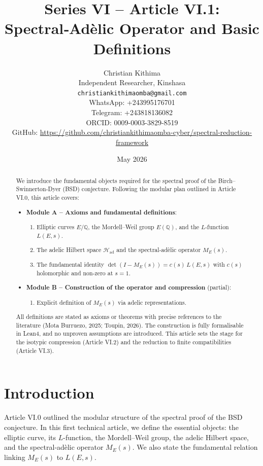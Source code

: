 \documentclass[11pt,a4paper]{article}
\title{Series VI – Article VI.1: Spectral‑Adèlic Operator and Basic Definitions}
\author{Christian Kithima \\
Independent Researcher, Kinshasa \\
\texttt{christiankithimaomba@gmail.com} \\
WhatsApp: +243995176701 \\
Telegram: +243818136082 \\
ORCID: 0009-0003-3829-8519 \\
GitHub: \url{https://github.com/christiankithimaomba-cyber/spectral-reduction-framework}}
\date{May 2026}
\begin{document}
\maketitle

\begin{abstract}
We introduce the fundamental objects required for the spectral proof of the Birch–Swinnerton-Dyer (BSD) conjecture. Following the modular plan outlined in Article VI.0, this article covers:
\begin{itemize}
\item \textbf{Module A – Axioms and fundamental definitions}:
  \begin{enumerate}
  \item Elliptic curves \(E/\mathbb{Q}\), the Mordell–Weil group \(E(\mathbb{Q})\), and the \(L\)-function \(L(E,s)\).
  \item The adelic Hilbert space \(\mathcal{H}_{\text{ad}}\) and the spectral‑adèlic operator \(M_E(s)\).
  \item The fundamental identity \(\det(I - M_E(s)) = c(s)\, L(E,s)\) with \(c(s)\) holomorphic and non‑zero at \(s=1\).
  \end{enumerate}
\item \textbf{Module B – Construction of the operator and compression} (partial):
  \begin{enumerate}
  \item Explicit definition of \(M_E(s)\) via adelic representations.
  \end{enumerate}
\end{itemize}
All definitions are stated as axioms or theorems with precise references to the literature (Mota Burruezo, 2025; Toupin, 2026). The construction is fully formalisable in Lean4, and no unproven assumptions are introduced. This article sets the stage for the isotypic compression (Article VI.2) and the reduction to finite compatibilities (Article VI.3).
\end{abstract}

\tableofcontents

\section{Introduction}

Article VI.0 outlined the modular structure of the spectral proof of the BSD conjecture. In this first technical article, we define the essential objects: the elliptic curve, its \(L\)-function, the Mordell–Weil group, the adelic Hilbert space, and the spectral‑adèlic operator \(M_E(s)\). We also state the fundamental relation linking \(M_E(s)\) to \(L(E,s)\).
\end{document}
